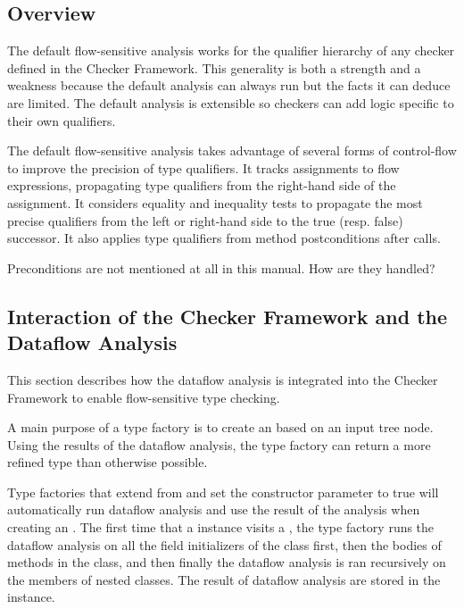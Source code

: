 \subsection{Overview}

The default flow-sensitive analysis 
works for the qualifier hierarchy of any checker defined in the
Checker Framework.  This generality is both a strength and a weakness
because the default analysis can always run but the facts it can
deduce are limited.  The default analysis is extensible so checkers
can add logic specific to their own qualifiers.

The default flow-sensitive analysis takes advantage of several forms
of control-flow to improve the precision of type qualifiers.  It
tracks assignments to flow expressions, propagating type qualifiers
from the right-hand side of the assignment.  It considers equality and
inequality tests to propagate the most precise qualifiers from the
left or right-hand side to the true (resp. false) successor.  It also
applies type qualifiers from method postconditions after calls.

\begin{workinprogress}
Preconditions are not mentioned at all in this manual. How are they handled?
\end{workinprogress}


\subsection{Interaction of the Checker Framework and the Dataflow Analysis}
\label{sec:flow-cf-interaction}

This section describes how the dataflow analysis is integrated into the
Checker Framework to enable flow-sensitive type checking.

A main purpose of a type factory is to create an 
based on an input tree node. Using the results of the dataflow analysis,
the type factory can return a more refined type than otherwise possible.

Type factories that extend from 
and set the constructor parameter  to true will automatically
run dataflow analysis and use the result of the analysis when creating an
.  The first time that a 
instance visits a , the type factory runs the dataflow analysis on all the field initializers of the class first, then the bodies of methods in
the class, and then finally the dataflow analysis is
ran recursively on the members of nested classes. The result of
dataflow analysis are stored in the  instance.

